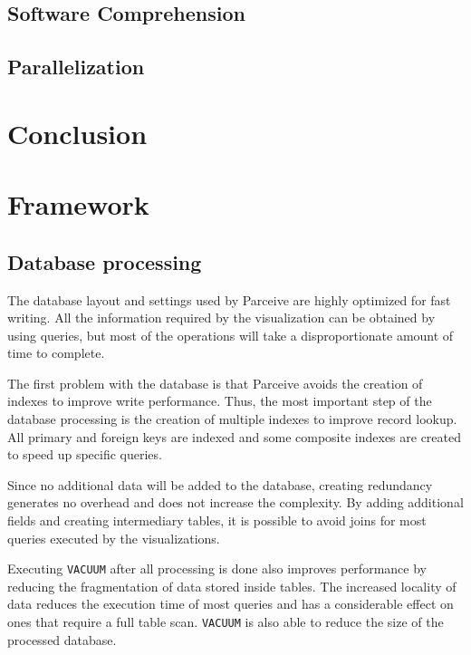 \documentclass[conference]{IEEEtran}
\begin{document}
\subsection{Software Comprehension}
\label{sec:software_comprehension}

\subsection{Parallelization}
\label{sec:related_work_parallelization}

\section{Conclusion}
\label{sec:conclusion}

\section{Framework}

\subsection{Database processing}
\label{dataprocessing}

The database layout and settings used by Parceive are highly optimized for fast writing. All the information required by the visualization can be obtained by using queries, but most of the operations will take a disproportionate amount of time to complete.

The first problem with the database is that Parceive avoids the creation of indexes to improve write performance. Thus, the most important step of the database processing is the creation of multiple indexes to improve record lookup. All primary and foreign keys are indexed and some composite indexes are created to speed up specific queries.

Since no additional data will be added to the database, creating redundancy generates no overhead and does not increase the complexity. By adding additional fields and creating intermediary tables, it is possible to avoid joins for most queries executed by the visualizations. 

Executing \texttt{VACUUM} after all processing is done also improves performance by reducing the fragmentation of data stored inside tables. The increased locality of data reduces the execution time of most queries and has a considerable effect on ones that require a full table scan. \texttt{VACUUM} is also able to reduce the size of the processed database.
\end{document}
